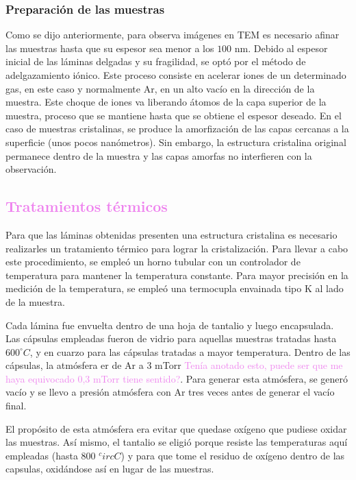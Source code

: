 \documentclass[12pt]{article}
\theoremstyle{definition}
\theoremstyle{remark}
\begin{document}
{\subsubsection{Preparación de las muestras}

Como se dijo anteriormente, para observa imágenes en TEM es necesario afinar las muestras hasta que su espesor sea menor a los $100$ nm. Debido al espesor inicial de las láminas delgadas y su fragilidad, se optó por el método de adelgazamiento iónico. Este proceso consiste en acelerar iones de un determinado gas, en este caso y normalmente Ar, en un alto vacío en la dirección de la muestra. Este choque de iones va liberando átomos de la capa superior de la muestra, proceso que se mantiene hasta que se obtiene el espesor deseado. En el caso de muestras cristalinas, se produce la amorfización de las capas cercanas a la superficie (unos pocos nanómetros). Sin embargo, la estructura cristalina original permanece dentro de la muestra y las capas amorfas no interfieren con la observación. 
 

\subsection{\textcolor{violet}{Tratamientos térmicos}}

Para que las láminas obtenidas presenten una estructura cristalina es necesario realizarles un tratamiento térmico para lograr la cristalización. Para llevar a cabo este procedimiento, se empleó un horno tubular con un controlador de temperatura para mantener la temperatura constante. Para mayor precisión en la medición de la temperatura, se empleó una termocupla envainada tipo K al lado de la muestra. 

Cada lámina fue envuelta dentro de una hoja de tantalio y luego encapsulada.
Las cápsulas empleadas fueron de vidrio para aquellas muestras tratadas hasta $600 ^\circ C$, y en cuarzo para las cápsulas tratadas a mayor temperatura. Dentro de las cápsulas, la atmósfera er de Ar a 3 mTorr \textcolor{violet}{Tenía anotado esto, puede ser que me haya equivocado 0,3 mTorr tiene sentido?}. Para generar esta atmósfera, se generó vacío y se llevo a presión atmósfera con Ar tres veces antes de generar el vacío final.

El propósito de esta atmósfera era evitar que quedase oxígeno que pudiese oxidar las muestras. Así mismo, el tantalio se eligió porque resiste las temperaturas aquí empleadas (hasta 800 $^circ C$) y para que tome el residuo de oxígeno dentro de las capsulas, oxidándose así en lugar de las muestras.

}
\end{document}
